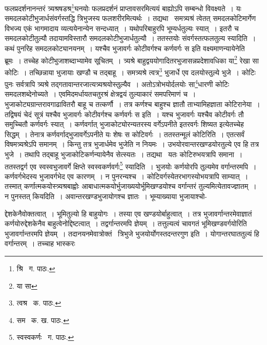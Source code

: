 \documentclass[11pt, openany]{book}
\begin{document}
\noindent फलप्रदर्शनानन्तरं त्र्यश्रषडश्र\renewcommand{\thefootnote}{१}\footnote{श्रि \textendash\ ग. पाठः.}घनयोः फलप्रदर्शनं प्राप्तावसरमित्ययं बाह्योऽपि सम्बन्धो विवक्ष्यते~। यः समदलकोटीभुजार्धसंवर्गस्तद्धि त्रिभुजस्य फलशरीरमित्यर्थः~। तद्यथा \textendash\ समत्र्यश्रं त्वेतत् समदलकोटिमार्गेण विभज्य एकं भागमादाय व्यत्ययेनान्येन सन्दध्यात्~। यथोपरिबाहुरपि भूम्यर्धतुल्यः स्यात्~। इतरौ च समदलकोटीतुल्यौ तदायामविस्तारौ समदलकोटीभुजार्धतुल्यौ~। ततस्तयोः संवर्गस्तत्फलतुल्य स्यादिति~। कथं पुनरिह समदलकोट्यानयनम्~। {\qt यश्चैव भुजावर्गः कोटीवर्गश्च कर्णवर्गः स} इति वक्ष्यमाणन्यायेनेति ब्रूमः~। तच्चेह कोटीभुजाशब्दाभ्यामेव सूचितम्~। त्र्यश्रे बाहुद्वययोगादितरभुजासन्नप्रदेशावधिका या\renewcommand{\thefootnote}{२}\footnote{या सा} रेखा सा कोटिः~। तच्छिन्नाया भुजायाः खण्डौ च तद्बाहू~। समत्र्यश्रे त्वत्र\renewcommand{\thefootnote}{३}\footnote{त्वश्र \textendash\ क. पाठः.} भुजार्धे एव
दलयोस्तुल्ये भुजे~। कोटिः पुनः सर्वत्रापि त्र्यश्रे तद्गतावान्तरजात्यत्र्यश्रयोस्तुल्यैव~। अतोऽत्रोभयोर्दलयोः सा\renewcommand{\thefootnote}{४}\footnote{सम \textendash\ क. ख. पाठः.}धारणी कोटिः समदलशब्देनोच्यते~। एवमिदमर्धायतचतुरश्रं क्षेत्रद्वयं तुल्याकारं समपरिमाणं च~। भुजाकोट्यग्रान्तरावगाढावितरौ बाहू च तत्कर्णौ~। तत्र कर्णश्च बाहुश्च ज्ञातौ ताभ्यामिहज्ञाता कोटिरानेया~। तद्विषयं चेदं सूत्रं {\qt यश्चैव भुजावर्गः कोटीवर्गश्च कर्णवर्गः स} इति~। यश्च भुजावर्गः यश्चैव कोटीवर्गः तौ समुच्चितौ कर्णवर्गः स्यात्~। कर्णवर्गात् भुजाकोट्योरन्यतरस्य वर्गेऽपनीते इतरवर्गः शिष्यत इत्येतच्चेह सिद्धम्~। तेनात्र कर्णवर्गाद्भुजावर्गेऽपनीते यः शेषः स कोटिवर्गः~। ततस्तन्मूलं कोटिरिति~। एतत्सर्वं विषमत्र्यश्रेऽपि समानम्~। किन्तु तत्र भुजार्धमेव भुजेति न नियमः~। उभयोरवान्तरखण्डयोरतुल्ये एव 
हि तत्र भुजे~। तथापि तद्बाहू भुजाकोटिकर्णन्यायेनैव सेत्स्यतः~। तद्यथा \textendash\ यतः कोटिरुभयत्रापि समाना~। ततस्तद्वर्ग एव स्वस्वभुजावर्गे क्षिप्ते स्वस्वकर्णवर्गः\renewcommand{\thefootnote}{५}\footnote{स्वस्वकर्णः \textendash\ ग. पाठः.} स्यादिति~। भुजयोः कर्णयोरपि तुल्यमेव वर्गान्तरमपि~। कर्णवर्गभेदस्य भुजावर्गभेद एव कारणम्~। न पुनरन्यश्च~। कोटिवर्गस्येतरभागस्योभयत्रापि साम्यात्~। तस्मात् कर्णात्मकयोस्त्र्यश्रबाह्वोः आबाधात्मकयोर्भुजाख्ययोर्भूमिखण्डयोश्च वर्गान्तरं तुल्यमित्येतावज्ज्ञातम्~। न पुनस्तत् कियदिति~। अवान्तरखण्डभुजायोगश्च ज्ञातः~। भूम्याख्याया भुजायाश्चो-

\newpage

\noindent द्देशकेनैवोक्तत्वात्~। भूमितुल्यो हि बाहुयोगः~। तस्या एव खण्डयोर्बाहुत्वात्~। तत्र भुजावर्गान्तरमेवाज्ञातं कर्णयोरुद्देशकेनैव
बाहुत्वेनोद्दिष्टत्वात्~। तद्वर्गान्तरमपि ज्ञेयम्~। तत्तुल्यत्वं चावगतं भूमिखण्डवर्गयोरिति भुजावर्गान्तरमपि ज्ञेयम्~। तदानयनमेवात्रोक्तं \textendash\ {\qt त्रिभुजे भुजयोर्योगस्तदन्तरगुण} इति~। योगान्तरघाततुल्यं हि वर्गान्तरम्~। तच्चाह भास्करः\textendash 
\end{document}
